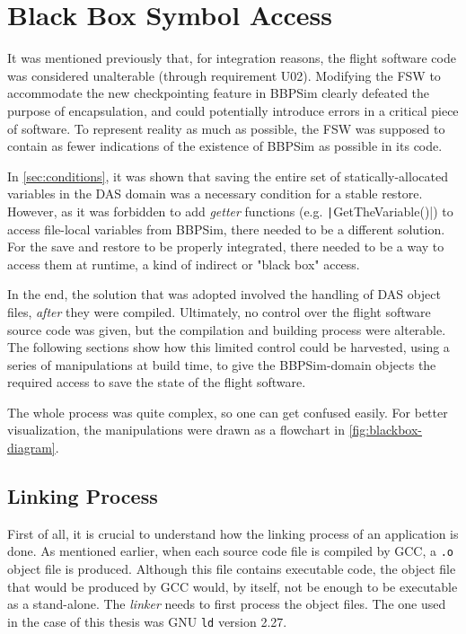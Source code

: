 {
\setlength{\parindent}{2em}
\section{Black Box Symbol Access}\label{sec:das-mem-restore}
It was mentioned previously that, for integration reasons, the flight software code was considered unalterable (through requirement U02). Modifying the \gls{FSW} to accommodate the new checkpointing feature in BBPSim clearly defeated the purpose of encapsulation, and could potentially introduce errors in a critical piece of software. To represent reality as much as possible, the FSW was supposed to contain as fewer indications of the existence of \gls{BBPSim} as possible in its code.

In \autoref{sec:conditions}, it was shown that saving the entire set of statically-allocated variables in the DAS domain was a necessary condition for a stable restore. However, as it was forbidden to add \textit{getter} functions (e.g. \texttt|GetTheVariable()|) to access file-local variables from BBPSim, there needed to be a different solution. For the save and restore to be properly integrated, there needed to be a way to access them at runtime, a kind of indirect or "black box" access. 

In the end, the solution that was adopted involved the handling of DAS object files, \textit{after} they were compiled. Ultimately, no control over the flight software source code was given, but the compilation and building process were alterable. The following sections show how this limited control could be harvested, using a series of manipulations at build time, to give the \gls{BBPSim}-domain objects the required access to save the state of the flight software.

The whole process was quite complex, so one can get confused easily. For better visualization, the manipulations were drawn as a flowchart in \autoref{fig:blackbox-diagram}.

\subsection*{Linking Process}
First of all, it is crucial to understand how the linking process of an application is done. As mentioned earlier, when each source code file is compiled by \gls{GCC}, a \texttt{.o} object file is produced. Although this file contains executable code, the object file that would be produced by GCC would, by itself, not be enough to be executable as a stand-alone. The \textit{linker} needs to first process the object files. The one used in the case of this thesis was GNU \texttt{ld} version 2.27.

}
